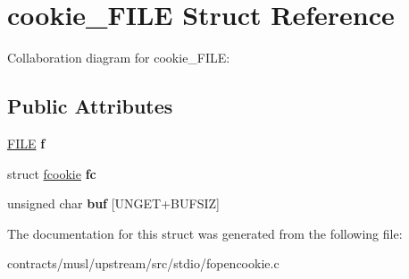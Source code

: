 \hypertarget{structcookie___f_i_l_e}{}\section{cookie\+\_\+\+F\+I\+LE Struct Reference}
\label{structcookie___f_i_l_e}


Collaboration diagram for cookie\+\_\+\+F\+I\+LE\+:
\subsection*{Public Attributes}
\begin{DoxyCompactItemize}
\item 
\mbox{\label{structcookie___f_i_l_e_a304ffbcf2f323aefee1180262411f36c}} 
\mbox{\hyperlink{struct___i_o___f_i_l_e}{F\+I\+LE}} {\bfseries f}
\item 
\mbox{\label{structcookie___f_i_l_e_aa1afad1a2b18dfab2bee49e8d47720a5}} 
struct \mbox{\hyperlink{structfcookie}{fcookie}} {\bfseries fc}
\item 
\mbox{\label{structcookie___f_i_l_e_a3fbfd2a97e6950abebd864f0fe7fb527}} 
unsigned char {\bfseries buf} \mbox{[}U\+N\+G\+ET+B\+U\+F\+S\+IZ\mbox{]}
\end{DoxyCompactItemize}


The documentation for this struct was generated from the following file\+:\begin{DoxyCompactItemize}
\item 
contracts/musl/upstream/src/stdio/fopencookie.\+c\end{DoxyCompactItemize}
